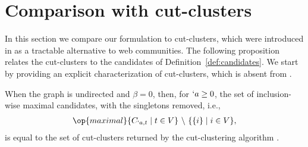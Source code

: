 
\section{Comparison with cut-clusters}
\label{sec:comparison-cut}

In this section we compare our formulation to cut-clusters, which were introduced in
\cite{flake:cut-clustering} as a tractable alternative to web communities.
%
%
The following proposition relates the cut-clusters to the candidates of Definition~\ref{def:candidates}.
We start by providing an explicit characterization of cut-clusters, which is absent from 
\cite{flake:cut-clustering}.
\begin{proposition}
  \label{prop:cut-clusters-from-candidates}
  When the graph is undirected and $\beta = 0$, then, for $`a \geq 0$,
  the set of inclusion-wise maximal candidates, with the singletons removed, i.e., 
  \begin{align}
	  \op{maximal} \{C_{`a, t} \mid  t\in V\} \ \backslash \ \{\Set{i} \mid i\in V\},\label{eq:cut-clusters}
  \end{align}
  is equal to the set of cut-clusters returned by the cut-clustering algorithm
  \cite[Fig.~2]{flake:cut-clustering}.
\end{proposition}

